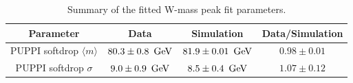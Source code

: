 \begin{table}[!h]
 \begin{center}
 \begin{tabular}{c|c|c|c}
  Parameter & Data & Simulation & Data/Simulation \\
  \hline
  PUPPI softdrop $\langle m \rangle$ & $80.3 \pm 0.8~{\rm \,\text{Ge\hspace{-.08em}V}}$ & $81.9 \pm 0.01~{\rm \,\text{Ge\hspace{-.08em}V}}$ & $0.98 \pm 0.01$ \\%
  PUPPI softdrop $\sigma$            & $ 9.0 \pm 0.9~{\rm \,\text{Ge\hspace{-.08em}V}}$ &  $8.5 \pm 0.4~{\rm \,\text{Ge\hspace{-.08em}V}}$  & $1.07 \pm 0.12$ \\%
  \hline
 \end{tabular}
 \caption{Summary of the fitted W-mass peak fit parameters.}
 \label{tab:app:wtagparams}
 \end{center}
\end{table}
\clearpage
%
%
